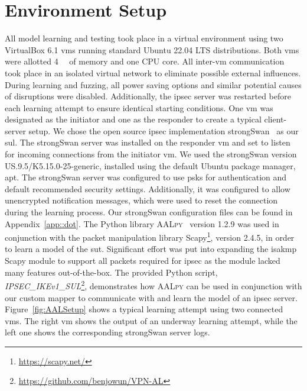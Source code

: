 \section{Environment Setup} \label{sec:env}
All model learning and testing took place in a virtual environment using two VirtualBox 6.1 \acp{vm} running standard Ubuntu 22.04 LTS distributions. Both \acp{vm} were allotted \SI{4}{\giga\byte} of memory and one CPU core. All inter-\ac{vm} communication took place in an isolated virtual network to eliminate possible external influences. During learning and fuzzing, all power saving options and similar potential causes of disruptions were disabled. Additionally, the \ac{ipsec} server was restarted before each learning attempt to ensure identical starting conditions. One \ac{vm} was designated as the initiator and one as the responder to create a typical client-server setup. We chose the open source \ac{ipsec} implementation strongSwan~\cite{software:strongSwan} as our \ac{sul}. The strongSwan server was installed on the responder \ac{vm} and set to listen for incoming connections from the initiator \ac{vm}. We used the strongSwan version US.9.5/K5.15.0-25-generic, installed using the default Ubuntu package manager, apt. The strongSwan server was configured to use \acp{psk} for authentication and default recommended security settings. Additionally, it was configured to allow unencrypted notification messages, which were used to reset the connection during the learning process. Our strongSwan configuration files can be found in Appendix~\ref{app::dot}. The Python library \textsc{AALpy}~\cite{software:aalpy} version 1.2.9 was used in conjunction with the packet manipulation library Scapy\footnote{\url{https://scapy.net/}}, version 2.4.5, in order to learn a model of the \ac{sut}. Significant effort was put into expanding the \ac{isakmp} Scapy module to support all packets required for \ac{ipsec} as the module lacked many features out-of-the-box. The provided Python script, \emph{IPSEC\_IKEv1\_SUL}\footnote{\url{https://github.com/benjowun/VPN-AL}}, demonstrates how \textsc{AALpy} can be used in conjunction with our custom mapper to communicate with and learn the model of an \ac{ipsec} server. Figure~\ref{fig:AALSetup} shows a typical learning attempt using two connected \acp{vm}. The right \ac{vm} shows the output of an underway learning attempt, while the left one shows the corresponding strongSwan server logs.
\fi

